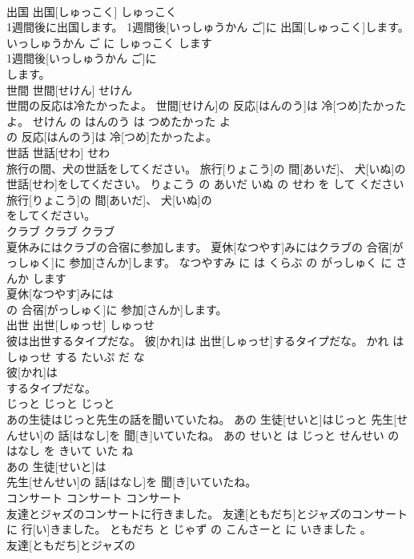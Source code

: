 \documentclass[8pt]{extreport}
\begin{document}
\begin{CJK}{UTF8}{min}
\\	出国	出国[しゅっこく]	しゅっこく	
\\	1週間後に出国します。	1週間後[いっしゅうかん ご]に 出国[しゅっこく]します。	いっしゅうかん ご に しゅっこく します	
\\	1週間後[いっしゅうかん ご]に
\\	します。			
\\	世間	世間[せけん]	せけん	
\\	世間の反応は冷たかったよ。	世間[せけん]の 反応[はんのう]は 冷[つめ]たかったよ。	せけん の はんのう は つめたかった よ	
\\	の 反応[はんのう]は 冷[つめ]たかったよ。			
\\	世話	世話[せわ]	せわ	
\\	旅行の間、犬の世話をしてください。	旅行[りょこう]の 間[あいだ]、 犬[いぬ]の 世話[せわ]をしてください。	りょこう の あいだ いぬ の せわ を して ください	
\\	旅行[りょこう]の 間[あいだ]、 犬[いぬ]の
\\	をしてください。			
\\	クラブ	クラブ	クラブ	
\\	夏休みにはクラブの合宿に参加します。	夏休[なつやす]みにはクラブの 合宿[がっしゅく]に 参加[さんか]します。	なつやすみ に は くらぶ の がっしゅく に さんか します	
\\	夏休[なつやす]みには
\\	の 合宿[がっしゅく]に 参加[さんか]します。			
\\	出世	出世[しゅっせ]	しゅっせ	
\\	彼は出世するタイプだな。	彼[かれ]は 出世[しゅっせ]するタイプだな。	かれ は しゅっせ する たいぷ だ な	
\\	彼[かれ]は
\\	するタイプだな。			
\\	じっと	じっと	じっと	
\\	あの生徒はじっと先生の話を聞いていたね。	あの 生徒[せいと]はじっと 先生[せんせい]の 話[はなし]を 聞[き]いていたね。	あの せいと は じっと せんせい の はなし を きいて いた ね	
\\	あの 生徒[せいと]は
\\	先生[せんせい]の 話[はなし]を 聞[き]いていたね。			
\\	コンサート	コンサート	コンサート	
\\	友達とジャズのコンサートに行きました。	友達[ともだち]とジャズのコンサートに 行[い]きました。	ともだち と じゃず の こんさーと に いきました 。	
\\	友達[ともだち]とジャズの

\end{CJK}
\end{document}
